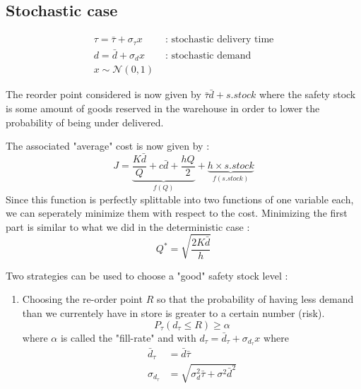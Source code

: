 \subsection{Stochastic case}

\[
    \begin{split}
    \tau = \bar\tau + \sigma_\tau x & \textrm{ : stochastic delivery time}\\
    d = \bar d + \sigma_d x & \textrm{ : stochastic demand }\\
    x\sim\mathcal{N}(0,1)
    \end{split}
\]

The reorder point considered is now given by $\bar\tau\bar d + s.stock$ where the safety stock is some amount of goods reserved in the warehouse in order to lower the probability of being under delivered.

The associated "average" cost  is now given by : 
\[
    J = \underbrace{\frac{K\bar d}Q + c\bar d + \frac{hQ}2}_{f(Q)} + \underbrace{h\times s.stock}_{f(s.stock)}
\]
Since this function is perfectly splittable into two functions of one variable each, we can seperately minimize them with respect to the cost.
Minimizing the first part is similar to what we did in the deterministic case : 
\[ Q^* = \sqrt{\frac{2K\bar d}h} \]

Two strategies can be used to choose a "good" safety stock level : 
\begin{enumerate}
    \item Choosing the re-order point $R$ so that the probability of having less demand than we currentely have in store is greater to a certain number (risk).
    \[
        P_\tau (d_\tau\le R)\ge\alpha
    \]
    where $\alpha$ is called the "fill-rate" and with $d_\tau=\bar d_\tau+\sigma_{d_\tau}x$ where
    \[
        \begin{split}
        \bar d_\tau &= \bar d \bar\tau \\
        \sigma_{d_\tau} &= \sqrt{ \sigma_d^2\bar\tau + \sigma^2\bar d^2 }
        \end{split}
    \]
\end{enumerate}